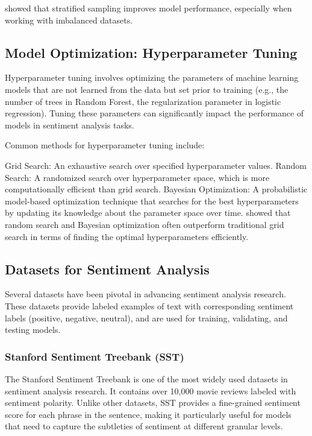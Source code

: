 \cite{Seiffert2010} showed that stratified sampling improves model performance, especially when working with imbalanced datasets.

\subsection{Model Optimization: Hyperparameter Tuning}

Hyperparameter tuning involves optimizing the parameters of machine learning models that are not learned from the data but set prior to training (e.g., the number of trees in Random Forest, the regularization parameter in logistic regression). Tuning these parameters can significantly impact the performance of models in sentiment analysis tasks.

Common methods for hyperparameter tuning include:

Grid Search: An exhaustive search over specified hyperparameter values.
Random Search: A randomized search over hyperparameter space, which is more computationally efficient than grid search.
Bayesian Optimization: A probabilistic model-based optimization technique that searches for the best hyperparameters by updating its knowledge about the parameter space over time.
\cite{Bergstra2011} showed that random search and Bayesian optimization often outperform traditional grid search in terms of finding the optimal hyperparameters efficiently.

\subsection{Datasets for Sentiment Analysis}

Several datasets have been pivotal in advancing sentiment analysis research. These datasets provide labeled examples of text with corresponding sentiment labels (positive, negative, neutral), and are used for training, validating, and testing models.

\subsubsection{Stanford Sentiment Treebank (SST)}

The Stanford Sentiment Treebank is one of the most widely used datasets in sentiment analysis research. It contains over 10,000 movie reviews labeled with sentiment polarity. Unlike other datasets, SST provides a fine-grained sentiment score for each phrase in the sentence, making it particularly useful for models that need to capture the subtleties of sentiment at different granular levels.

